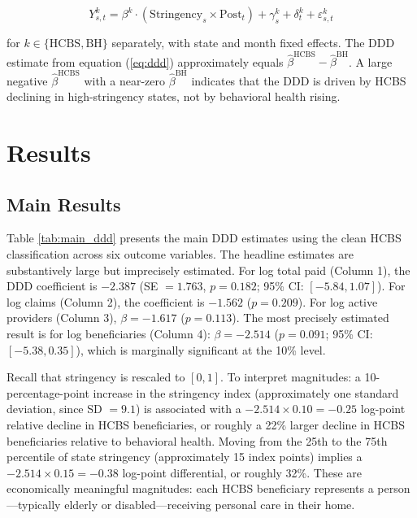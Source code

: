 \documentclass[12pt]{article}
\begin{document}
\begin{equation}
Y_{s,t}^{k} = \beta^{k} \cdot (\text{Stringency}_s \times \text{Post}_t) + \gamma_s^{k} + \delta_t^{k} + \varepsilon_{s,t}^{k}
\label{eq:decomp}
\end{equation}

\noindent for $k \in \{\text{HCBS}, \text{BH}\}$ separately, with state and month fixed effects. The DDD estimate from equation (\ref{eq:ddd}) approximately equals $\hat{\beta}^{\text{HCBS}} - \hat{\beta}^{\text{BH}}$. A large negative $\hat{\beta}^{\text{HCBS}}$ with a near-zero $\hat{\beta}^{\text{BH}}$ indicates that the DDD is driven by HCBS declining in high-stringency states, not by behavioral health rising.


\section{Results}

\subsection{Main Results}



Table \ref{tab:main_ddd} presents the main DDD estimates using the clean HCBS classification across six outcome variables. The headline estimates are substantively large but imprecisely estimated. For log total paid (Column 1), the DDD coefficient is $-2.387$ (SE $= 1.763$, $p = 0.182$; 95\% CI: $[-5.84, 1.07]$). For log claims (Column 2), the coefficient is $-1.562$ ($p = 0.209$). For log active providers (Column 3), $\beta = -1.617$ ($p = 0.113$). The most precisely estimated result is for log beneficiaries (Column 4): $\beta = -2.514$ ($p = 0.091$; 95\% CI: $[-5.38, 0.35]$), which is marginally significant at the 10\% level.

Recall that stringency is rescaled to $[0,1]$. To interpret magnitudes: a 10-percentage-point increase in the stringency index (approximately one standard deviation, since SD $= 9.1$) is associated with a $-2.514 \times 0.10 = -0.25$ log-point relative decline in HCBS beneficiaries, or roughly a 22\% larger decline in HCBS beneficiaries relative to behavioral health. Moving from the 25th to the 75th percentile of state stringency (approximately 15 index points) implies a $-2.514 \times 0.15 = -0.38$ log-point differential, or roughly 32\%. These are economically meaningful magnitudes: each HCBS beneficiary represents a person---typically elderly or disabled---receiving personal care in their home.
\end{document}
